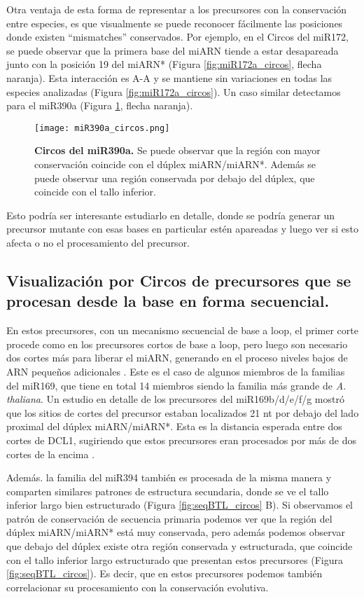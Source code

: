 Otra ventaja de esta forma de representar a los precursores con la conservación entre especies, es que visualmente se puede reconocer fácilmente las posiciones donde existen ``mismatches'' conservados. 
Por ejemplo, en el Circos del miR172, se puede observar que la primera base del miARN tiende a estar desapareada junto con la posición 19 del miARN* (Figura \ref{fig:miR172a_circos}, flecha naranja). 
Esta interacción es A-A y se mantiene sin variaciones en todas las especies analizadas (Figura \ref{fig:miR172a_circos}).
Un caso similar detectamos para el miR390a (Figura \ref{fig:miR390a_circos}, flecha naranja).

\begin{figure}[htbp!] 
    \centering    
    \texttt{[image: miR390a\_circos.png]}
    \caption[Circos del miR172a]{
    \textbf{Circos del miR390a.}
    Se puede observar que la región con mayor conservación coincide con el dúplex miARN/miARN*.
    Además se puede observar una región conservada por debajo del dúplex, que coincide con el tallo inferior.
    }
     \label{fig:miR390a_circos}
\end{figure}


Esto podría ser interesante estudiarlo en detalle, donde se podría generar un precursor mutante con esas bases en particular estén apareadas y luego ver si esto afecta o no el procesamiento del precursor.  

\subsection{Visualización por Circos de precursores que se procesan desde la base en forma secuencial.}

En estos precursores, con un mecanismo secuencial de base a loop, el primer corte procede como en los precursores cortos de base a loop, pero luego son necesario dos cortes más para liberar el miARN, generando en el proceso niveles bajos de ARN pequeños adicionales \citep{Bologna2013}.
Este es el caso de algunos miembros de la  familias del miR169, que tiene en total 14 miembros siendo la familia más grande de \textit{A. thaliana}.
Un estudio en detalle de los precursores del miR169b/d/e/f/g mostró que los sitios de cortes del precursor estaban localizados 21 nt por debajo del lado proximal del dúplex miARN/miARN*.
Esta es la distancia esperada entre dos cortes de DCL1, sugiriendo que estos precursores eran procesados por más de dos cortes de la encima \citep{Bologna2013}.

Además. la familia del miR394 también es procesada de la misma manera y comparten similares patrones de estructura secundaria, donde se ve el tallo inferior largo bien estructurado (Figura \ref{fig:seqBTL_circos} B).
Si observamos el patrón de conservación de secuencia primaria podemos ver que la región del dúplex miARN/miARN* está muy conservada, pero además podemos observar que debajo del dúplex existe otra región conservada y estructurada, que coincide con el tallo inferior largo estructurado que presentan estos precursores (Figura \ref{fig:seqBTL_circos}).
Es decir, que en estos precursores podemos también correlacionar su procesamiento con la conservación evolutiva.


